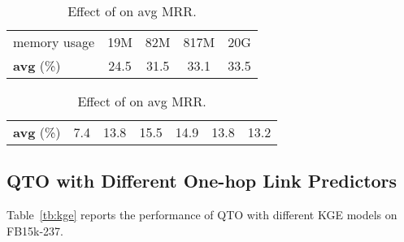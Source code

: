 \begin{table}[htbp]
    \centering
    \begin{minipage}{0.4\linewidth}
        \centering
        \begin{tabular}{lcccc}
            \toprule
             &  &  &   &  \\
            \midrule
            memory usage & 19M & 82M & 817M & 20G \\
            {\bf avg} (\%) & 24.5 & 31.5 & 33.1 & 33.5 \\
            \toprule
        \end{tabular}
        \caption{Effect of  on memory usage and avg MRR.}
        \label{tb:eps}
    \end{minipage}
    \qquad
    \begin{minipage}{0.5\linewidth}
        \centering
        \begin{tabular}{lcccccc}
            \toprule
             &  &  &  &  &  &  \\
            \midrule
            {\bf avg} (\%) & 7.4 & 13.8 & 15.5 & 14.9 & 13.8 & 13.2 \\
            \toprule
        \end{tabular}
        \caption{Effect of  on avg MRR.}
        \label{tb:alpha}
    \end{minipage}
\end{table}

\subsection{QTO with Different One-hop Link Predictors}
\label{app:kge}
Table~\ref{tb:kge} reports the performance of QTO with different KGE models on FB15k-237.

